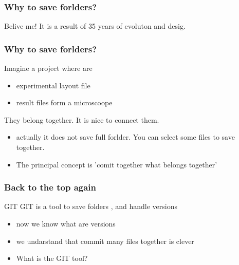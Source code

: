 \documentclass[aspectratio=169]{beamer}
\begin{document}
\begin{frame}
\frametitle<presentation>{Why to save forlders?}

Belive me! It is a result of 35 years of evoluton and desig. 

\end{frame}

\begin{frame}
\frametitle<presentation>{Why to save forlders?}

Imagine a project where are 
\begin{itemize}
  		\item experimental layout file
		\item result files form a microscoope
\end{itemize}
\pause
They belong together. It is nice to connect them.
\pause
\begin{itemize}
  		\item actually it does not save full forlder. You can select some files to save together.
		\item The principal concept is 'comit together what belongs together'
\end{itemize}


\end{frame}




\begin{frame}
\frametitle<presentation>{Back to the top again}
  
  
	\begin{block}{GIT}
		GIT is a  tool to save folders , and handle versions
	\end{block}
  
	\begin{itemize}
  		\item now we know what are versions
		\item we undarstand that commit many files together is clever
		\pause
		\item What is the GIT tool?
	\end{itemize}

\end{frame}
\end{document}
